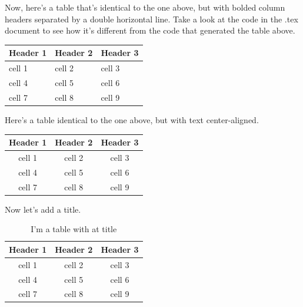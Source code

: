 \documentclass{article}
\begin{document}

\noindent Now, here's a table that's identical to the one above, but with bolded column headers separated by a double horizontal line. Take a look at the code in the .tex document to see how it's different from the code that generated the table above. %

\begin{tabular}{|l|l|l|}
\hline
\textbf{Header 1} & \textbf{Header 2} & \textbf{Header 3} \\
\hline\hline
cell 1 & cell 2 & cell 3 \\
\hline
cell 4 & cell 5 & cell 6 \\
\hline
cell 7 & cell 8 & cell 9 \\
\hline
\end{tabular}

\noindent Here's a table identical to the one above, but with text center-aligned.

\begin{tabular}{|c|c|c|}
\hline
\textbf{Header 1} & \textbf{Header 2} & \textbf{Header 3} \\
\hline\hline
cell 1 & cell 2 & cell 3 \\
\hline
cell 4 & cell 5 & cell 6 \\
\hline
cell 7 & cell 8 & cell 9 \\
\hline
\end{tabular}

\vspace{.2in} %

\noindent Now let's add a title. %

\begin{table}[h!] 
\caption*{I'm a table with at title}
\centering
\begin{tabular}{|c|c|c|}
\hline
\textbf{Header 1} & \textbf{Header 2} & \textbf{Header 3} \\
\hline\hline
cell 1 & cell 2 & cell 3 \\
\hline
cell 4 & cell 5 & cell 6 \\
\hline
cell 7 & cell 8 & cell 9 \\
\hline
\end{tabular}
\end{table}
\end{document}
